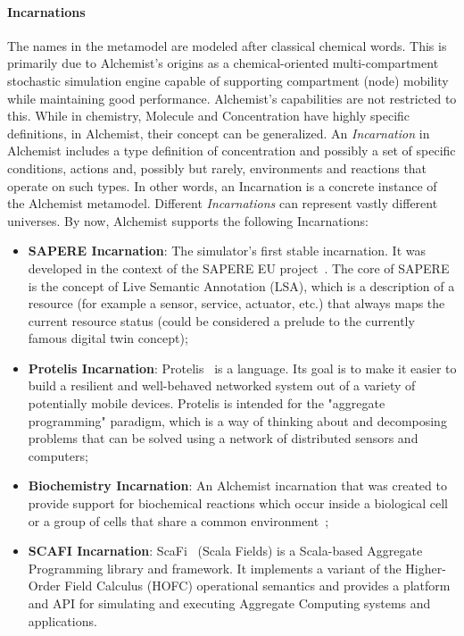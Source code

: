 
\paragraph{Incarnations} The names in the metamodel are modeled after classical chemical words. This is primarily due to Alchemist's origins as a chemical-oriented multi-compartment stochastic simulation engine capable of supporting compartment (node) mobility while maintaining good performance. Alchemist's capabilities are not restricted to this. While in chemistry, Molecule and Concentration have highly specific definitions, in Alchemist, their concept can be generalized. An \textit{Incarnation} in Alchemist includes a type definition of concentration and possibly a set of specific conditions, actions and, possibly but rarely, environments and reactions that operate on such types. In other words, an Incarnation is a concrete instance of the Alchemist metamodel.\newline
Different \textit{Incarnations} can represent vastly different universes. By now, Alchemist supports the following Incarnations:
\begin{itemize}
	\item \textbf{SAPERE Incarnation}: The simulator's first stable incarnation. It was developed in the context of the SAPERE EU project~\cite{SAPEREon48:online}. The core of SAPERE is the concept of Live Semantic Annotation (LSA), which is a description of a resource (for example a sensor, service, actuator, etc.) that always maps the current resource status (could be considered a prelude to the currently famous digital twin concept);
	\item \textbf{Protelis Incarnation}: Protelis~\cite{Protelis97:online} is a language. Its goal is to make it easier to build a resilient and well-behaved networked system out of a variety of potentially mobile devices. Protelis is intended for the "aggregate programming" paradigm, which is a way of thinking about and decomposing problems that can be solved using a network of distributed sensors and computers;
	\item \textbf{Biochemistry Incarnation}: An Alchemist incarnation that was created to provide support for biochemical reactions which occur inside a biological cell or a group of cells that share a common environment~\cite{Biochemi16:online};
	\item \textbf{SCAFI Incarnation}: ScaFi~\cite{ScaFiAgg69:online} (Scala Fields) is a Scala-based Aggregate Programming library and framework. It implements a variant of the Higher-Order Field Calculus (HOFC) operational semantics and provides a platform and API for simulating and executing Aggregate Computing systems and applications.
\end{itemize}

